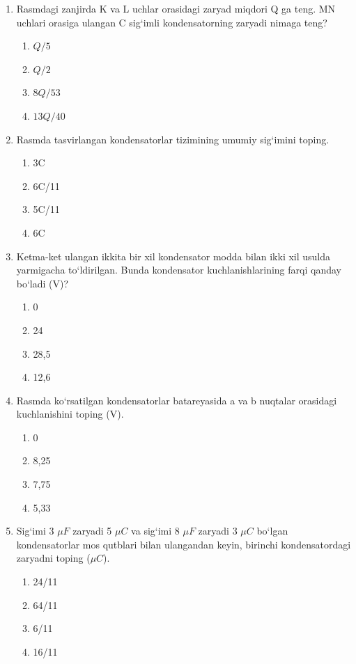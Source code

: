 \begin{enumerate}
\item  Rasmdagi zanjirda K va L uchlar orasidagi zaryad miqdori Q ga teng. MN uchlari orasiga ulangan C sig‘imli kondensatorning zaryadi nimaga teng?
\begin{enumerate}[label=\Alph*)]
\item $Q/5$
\item $Q/2$
\item $8Q/53$
\item $13Q/40$
\end{enumerate}

\item Rasmda tasvirlangan kondensatorlar tizimining umumiy sig‘imini toping.
\begin{enumerate}[label=\Alph*)]
\item 3C
\item 6C/11
\item 5C/11
\item 6C
\end{enumerate}

\item  Ketma-ket ulangan ikkita bir xil kondensator modda bilan ikki xil usulda yarmigacha to‘ldirilgan. Bunda kondensator kuchlanishlarining farqi qanday bo‘ladi (V)?
\begin{enumerate}[label=\Alph*)]
\item 0
\item 24
\item 28,5
\item 12,6
\end{enumerate}

\item  Rasmda ko‘rsatilgan kondensatorlar batareyasida a va b nuqtalar orasidagi kuchlanishini toping (V).
\begin{enumerate}[label=\Alph*)]
\item 0
\item 8,25
\item 7,75
\item 5,33
\end{enumerate}

\item Sig‘imi 3 $\mu F$ zaryadi 5 $\mu C$ va sig‘imi 8 $\mu F$ zaryadi 3 $\mu C$ bo‘lgan kondensatorlar mos qutblari bilan ulangandan keyin, birinchi kondensatordagi zaryadni toping ($\mu C$).
\begin{enumerate}[label=\Alph*)]
\item 24/11
\item 64/11
\item 6/11
\item 16/11
\end{enumerate}


\end{enumerate}
